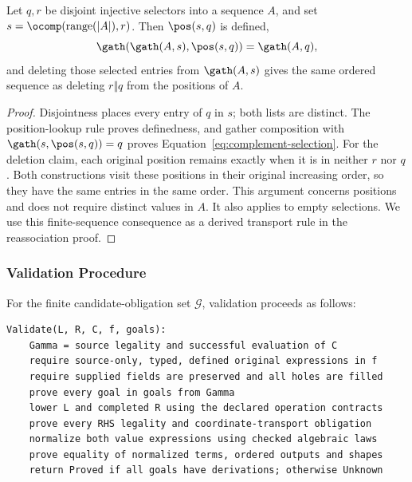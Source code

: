 \begin{lemma}
\label{lem:selection-complement}
Let $q,r$ be disjoint injective selectors into a sequence $A$, and set
$s=\ocomp(\operatorname{range}(|A|),r)$. Then $\pos(s,q)$ is defined,
\begin{equation}
 \gath(\gath(A,s),\pos(s,q))=\gath(A,q),
 \label{eq:complement-selection}
\end{equation}
and deleting those selected entries from $\gath(A,s)$ gives the same
ordered sequence as deleting $r\Vert q$ from the positions of $A$.
\end{lemma}
\begin{proof}
Disjointness places every entry of $q$ in $s$; both lists are distinct.
The position-lookup rule proves definedness, and gather composition with
$\gath(s,\pos(s,q))=q$ proves Equation~\eqref{eq:complement-selection}.
For the deletion claim, each original position remains exactly when it is
in neither $r$ nor $q$. Both constructions visit these positions in their
original increasing order, so they have the same entries in the same order.
This argument concerns positions and does not require distinct values in
$A$. It also applies to empty selections. We use this finite-sequence
consequence as a derived transport rule in the reassociation proof.
\end{proof}

\subsubsection{Validation Procedure}
\label{app:validation-procedure}
For the finite candidate-obligation set $\mathcal G$, validation proceeds as follows:

\noindent\begin{minipage}{\linewidth}
\begin{lstlisting}[language={},caption={Validation of a completed candidate.}]
Validate(L, R, C, f, goals):
    Gamma = source legality and successful evaluation of C
    require source-only, typed, defined original expressions in f
    require supplied fields are preserved and all holes are filled
    prove every goal in goals from Gamma
    lower L and completed R using the declared operation contracts
    prove every RHS legality and coordinate-transport obligation
    normalize both value expressions using checked algebraic laws
    prove equality of normalized terms, ordered outputs and shapes
    return Proved if all goals have derivations; otherwise Unknown
\end{lstlisting}
\end{minipage}



